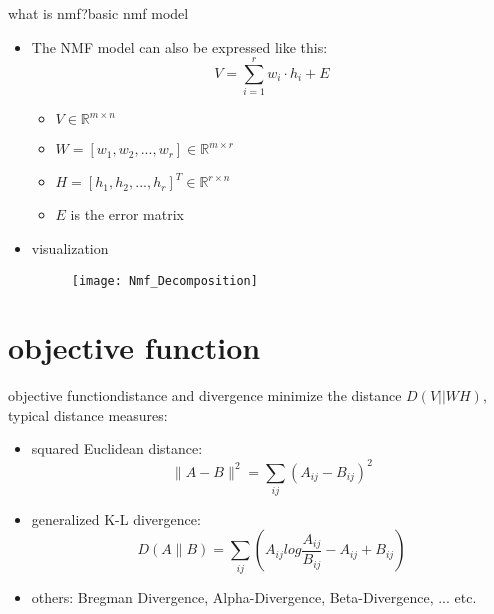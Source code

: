         \begin{frame}{what is nmf?}{basic nmf model}
            \begin{itemize}
                \item  The NMF model can also be expressed like this:\\
                \begin{equation*}
                V = \sum_{i = 1}^r w_{i} \cdot h_{i} + E
                \end{equation*}
			    \begin{itemize}
					\item  $V \in \mathbb{R}^{m \times n}$
					\item  $W = [w_{1}, w_{2}, ..., w_{r}] \in \mathbb{R}^{m \times r}$
					\item  $H  = [h_{1}, h_{2}, ..., h_{r}]^{T} \in \mathbb{R}^{r \times n}$
					\item  $E$ is the error matrix													   
				\end{itemize}			                   
                         
                \bigskip
                \item  visualization
                \begin{figure}
                		\texttt{[image: Nmf\_Decomposition]}
                \end{figure}
            \end{itemize}
        \end{frame}        
        
    \section[objective function]{objective function}
        \begin{frame}{objective function}{distance and divergence}
        minimize the distance $D(V || WH)$,  typical distance measures:\\
        
           \begin{itemize}
                \item  squared Euclidean distance:\\
                \begin{equation*}
                \parallel A - B\parallel^{2} = \sum_{i j} (A_{i j} - B_{i j})^{2}
                \end{equation*}
			   \item  generalized K-L divergence:\\
			   \begin{equation*}
                D( A \parallel B) = \sum_{i j} (A_{i j} log\frac{A_{i j}}{B_{i j}} - A_{i j} + B_{i j})
                \end{equation*}		                
                \bigskip
                \item<2-> others: Bregman Divergence, Alpha-Divergence, Beta-Divergence, ... etc.
           \end{itemize}
        \end{frame}          
    
